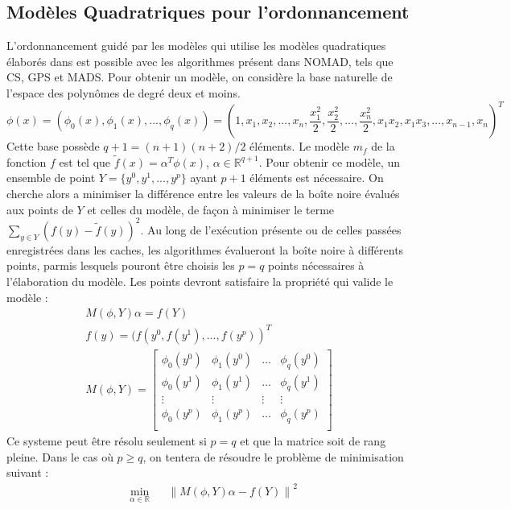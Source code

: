 \documentclass[letterpaper]{scrartcl}
\newcommand{\R}{\mathbb{R}}
\newcommand{\norm}[1]{\left\lVert#1\right\rVert}
\begin{document}
	\subsection{Modèles Quadratriques pour l'ordonnancement}
L'ordonnancement guidé par les modèles qui utilise les modèles quadratiques élaborés dans \cite{CoLed2011} est possible avec les algorithmes présent dans NOMAD, tels que CS, GPS et MADS. Pour obtenir un modèle, on considère la base naturelle de l'espace des polynômes de degré deux et moins. 
\begin{equation*}
\phi (x)=(\phi_0(x),\phi_1(x),...,\phi_q(x)) = \left(1,x_1,x_2,...,x_n,\frac{x_1^2}{2},\frac{x_2^2}{2},...,\frac{x_n^2}{2},x_1 x_2, x_1 x_3,...,x_{n-1},x_{n}\right)^T
\end{equation*}
Cette base possède $q+1 = (n+1)(n+2)/2$ éléments. Le modèle $m_f$ de la fonction $f$ est tel que $\tilde{f}(x)=\alpha^T\phi(x)$, $\alpha \in \R^{q+1}$. Pour obtenir ce modèle, un ensemble de point $Y=\{y^0,y^1,...,y^p\}$ ayant $p+1$ éléments est nécessaire. On cherche alors a minimiser la différence entre les valeurs de la boîte noire évalués aux points de $Y$ et celles du modèle, de façon à minimiser le terme $\underset{y\in Y}{\sum}{(f(y)-\tilde{f}(y))^2}$. Au long de l'exécution présente ou de celles passées enregistrées dans les caches, les algorithmes évalueront la boîte noire à différents points, parmis lesquels pouront être choisis les $p = q$ points nécessaires à l'élaboration du modèle. Les points devront satisfaire la propriété qui valide le modèle : 
\begin{gather*}
	M(\phi,Y)\alpha = f(Y)\\
	f(y)=(f(y^0,f(y^1),...,f(y^p))^T\\
	M(\phi,Y) = 
	\begin{bmatrix}
	\phi_0(y^0) & \phi_1(y^0) & \dots & \phi_q(y^0)\\
	\phi_0(y^1) & \phi_1(y^1) & \dots & \phi_q(y^1)\\
	\vdots & \vdots & \vdots & \vdots\\
	\phi_0(y^p) & \phi_1(y^p) & \dots & \phi_q(y^p)\\
	\end{bmatrix}
\end{gather*}
Ce systeme peut être résolu seulement si $p=q$ et que la matrice soit de rang pleine. Dans le cas où $p\geq q$, on tentera de résoudre le problème de minimisation suivant : 
\begin{equation*}
\begin{aligned}
& \underset{\alpha \in \R}{\text{min}}
& & \norm{M(\phi,Y)\alpha -f(Y)}^2
\end{aligned}
\end{equation*}
\end{document}
